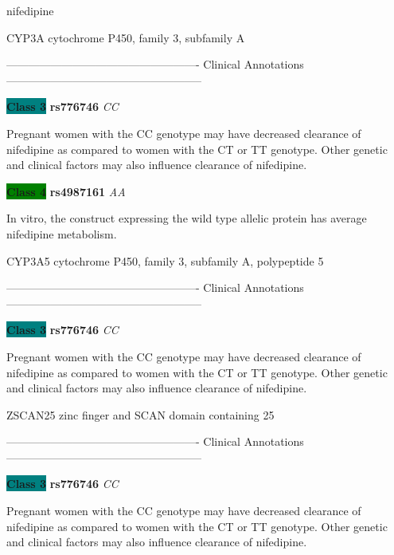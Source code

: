 \documentclass{resume} %
\begin{document}
\begin{rSection}{ nifedipine }
\begin{rSubsection}{ CYP3A }{ cytochrome P450, family 3, subfamily A }{}{}
\item[] ---------------------------------------------------- Clinical Annotations -----------------------------------------------------\newline
\item \textbf{\colorbox{teal} {Class 3}} \textbf{ rs776746 } \textit{ CC }
\item[] Pregnant women with the CC genotype may have decreased clearance of nifedipine as compared to women with the CT or TT genotype. Other genetic and clinical factors may also influence clearance of nifedipine.\item \textbf{\colorbox{green} {Class 4}} \textbf{ rs4987161 } \textit{ AA }
\item[] In vitro, the construct expressing the wild type allelic protein has average nifedipine metabolism.
\end{rSubsection}\begin{rSubsection}{ CYP3A5 }{ cytochrome P450, family 3, subfamily A, polypeptide 5 }{}{}
\item[]

\item[] ---------------------------------------------------- Clinical Annotations -----------------------------------------------------\newline
\item \textbf{\colorbox{teal} {Class 3}} \textbf{ rs776746 } \textit{ CC }
\item[] Pregnant women with the CC genotype may have decreased clearance of nifedipine as compared to women with the CT or TT genotype. Other genetic and clinical factors may also influence clearance of nifedipine.
\end{rSubsection}\begin{rSubsection}{ ZSCAN25 }{ zinc finger and SCAN domain containing 25 }{}{}
\item[]

\item[] ---------------------------------------------------- Clinical Annotations -----------------------------------------------------\newline
\item \textbf{\colorbox{teal} {Class 3}} \textbf{ rs776746 } \textit{ CC }
\item[] Pregnant women with the CC genotype may have decreased clearance of nifedipine as compared to women with the CT or TT genotype. Other genetic and clinical factors may also influence clearance of nifedipine.
\end{rSubsection}


\end{rSection}
\end{document}
